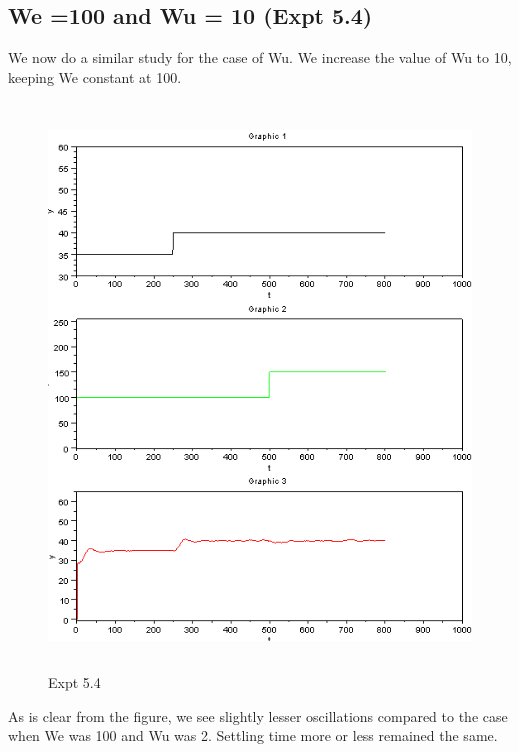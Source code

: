 \subsection{We =100 and Wu = 10 (Expt 5.4)}
We now do a similar study for the case of Wu. We increase the value of Wu to 10, keeping We constant at 100.
\begin{figure}[H]
  \includegraphics[width=12cm, height=15cm]{mpc/5_4.PNG}
  \caption{Expt 5.4}
\end{figure}
As is clear from the figure, we see slightly lesser oscillations compared to the case when We was 100 and Wu was 2. Settling time more or less remained the same.
